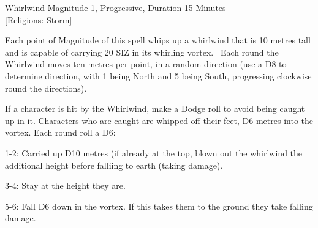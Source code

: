 \begin{rpg-spell}
{Whirlwind}
{Magnitude 1, Progressive, Duration 15 Minutes\\{[Religions: Storm]}}

Each point of Magnitude of this spell whips up a whirlwind that is 10 metres tall and is capable of carrying 20 SIZ in its whirling vortex.  Each round the Whirlwind moves ten metres per point, in a random direction (use a D8 to determine direction, with 1 being North and 5 being South, progressing clockwise round the directions). 

If a character is hit by the Whirlwind, make a Dodge roll to avoid being caught up in it. Characters who are caught are whipped off their feet, D6 metres into the vortex. Each round roll a D6:
\begin{rpg-list}
\item 1-2: Carried up D10 metres (if already at the top, blown out the whirlwind the additional height before falliing to earth (taking damage).
\item 3-4: Stay at the height they are.
\item 5-6: Fall D6 down in the vortex. If this takes them to the ground they take falling damage.
\end{rpg-list}
\end{rpg-spell}



